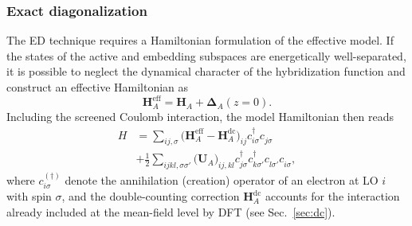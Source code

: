 \documentclass[aps,prx,twocolumn,superscriptaddress]{revtex4-2}
\begin{document}
\subsubsection{Exact diagonalization}
The ED technique requires a Hamiltonian formulation of the effective model.  
If the states of the active and embedding subspaces are energetically well-separated, 
it is possible to neglect the dynamical character of the hybridization function 
and construct an effective Hamiltonian as
\begin{equation} \label{eq:HA_eff}
    \mathbf{H}^{\mathrm{eff}}_A = \mathbf{H}_A + \mathbf{\Delta}_A(z=0).
\end{equation} 
Including the screened Coulomb interaction, the model Hamiltonian then reads
\begin{equation}
\begin{split}
H & = \sum_{ij,\sigma} \big( \mathbf{H}^{\mathrm{eff}}_A-\mathbf{H}^{\mathrm{dc}}_A \big)_{ij}c^{\dagger}_{i\sigma} c^{\phantom{\dagger}}_{j\sigma} \\ 
  & + \frac{1}{2} \sum_{ijkl,\sigma\sigma'} \big( \mathbf{U}_A \big)_{ij,kl} c^{\dagger}_{j\sigma} c^{\dagger}_{k\sigma'} c^{\phantom{\dagger}}_{l\sigma'} c^{\phantom{\dagger}}_{i\sigma},
 \end{split}
\end{equation}
where $c^{(\dagger)}_{i\sigma}$ denote the annihilation (creation) operator of an electron at LO $i$ with spin $\sigma$, and the double-counting correction $\mathbf{H}^{\mathrm{dc}}_A$ accounts for the interaction already included at the mean-field level by DFT (see Sec.~\ref{sec:dc}).  
\end{document}
